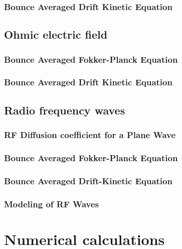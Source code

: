 \documentclass[11pt,a4paper]{report}
\begin{document}
		\subsection{Bounce Averaged Drift Kinetic Equation}
		

	\section{Ohmic electric field}
	

		\subsection{Bounce Averaged Fokker-Planck Equation}
		

		\subsection{Bounce Averaged Drift Kinetic Equation}
		

	\section{Radio frequency waves}
	

		\subsection{RF Diffusion coefficient for a Plane Wave}
		

		\subsection{Bounce Averaged Fokker-Planck Equation}
		

		\subsection{Bounce Averaged Drift-Kinetic Equation}
		

		\subsection{Modeling of RF Waves}
		

\chapter{Numerical calculations}
\end{document}

